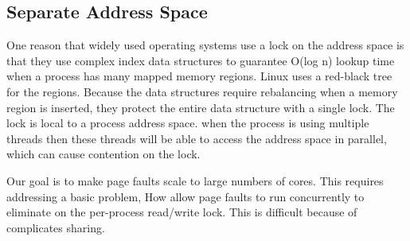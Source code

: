 
\subsection{Separate Address Space}
One reason that widely used operating systems 
use a lock on the address space is 
that they use complex index data structures to guarantee O(log n)
lookup time when a process has many mapped memory
regions. Linux uses a red-black tree for the regions\cite{linux}. 
Because the data structures require rebalancing 
when a memory region is inserted, 
they protect the entire data structure with a single lock.
The lock is local to a process address space.
when the process is using multiple threads 
then these threads will be able to access
the address space in parallel, 
which can cause contention on the lock.

Our goal is to make page faults scale to 
large numbers of cores.
This requires addressing a basic problem,
How allow page faults to run concurrently to eliminate on the per-process read/write lock.
This is difficult because of complicates sharing.

